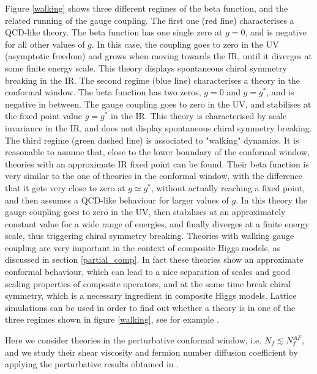 Figure \ref{walking} shows three different regimes of the beta function, and the related running of the gauge coupling. The first one (red line) characterises a QCD-like theory. The beta function has one single zero at $g=0$, and is negative for all other values of $g$. In this case, the coupling goes to zero in the UV (asymptotic freedom) and grows when moving towards the IR, until it diverges at some finite energy scale. This theory displays spontaneous chiral symmetry breaking in the IR. The second regime (blue line) characterises a theory in the conformal window. The beta function has two zeros, $g=0$ and $g=g^*$, and is negative in between. The gauge coupling goes to zero in the UV, and stabilises at the fixed point value $g=g^*$ in the IR. This theory is characterised by scale invariance in the IR, and does not display spontaneous chiral symmetry breaking. The third regime (green dashed line) is associated to "walking" dynamics. It is reasonable to assume that, close to the lower boundary of the conformal window, theories with an approximate IR fixed point can be found. Their beta function is very similar to the one of theories in the conformal window, with the difference that it gets very close to zero at $g\simeq g^*$, without actually reaching a fixed point, and then assumes a QCD-like behaviour for larger values of $g$. In this theory the gauge coupling goes to zero in the UV, then stabilises at an approximately constant value for a wide range of energies, and finally diverges at a finite energy scale, thus triggering chiral symmetry breaking. Theories with walking gauge coupling are very important in the context of composite Higgs models, as discussed in section \ref{partial_comp}. In fact these theories show an approximate conformal behaviour, which can lead to a nice separation of scales and good scaling properties of composite operators, and at the same time break chiral symmetry, which is a necessary ingredient in composite Higgs models.
Lattice simulations can be used in order to find out whether a theory is in one of the three regimes shown in figure \ref{walking}, see for example \cite{Hietanen:2008mr,Hansen:2017ejh}.

Here we consider theories in the perturbative conformal window, i.e. $N_f \lesssim N_f^{AF}$, and we study their shear viscosity and fermion number diffusion coefficient by applying the perturbative results obtained in \cite{Arnold:2000dr}.


